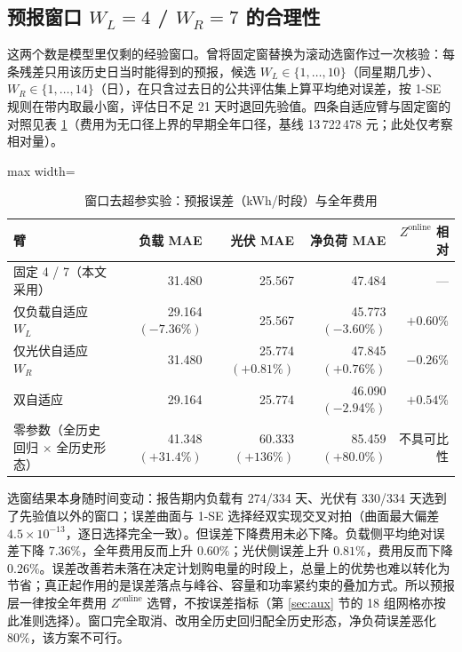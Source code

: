 \documentclass[12pt,a4paper]{ctexart}
\newcommand{\Zon}{Z^{\mathrm{online}}}
\begin{document}
\subsection{预报窗口 $W_L=4$ / $W_R=7$ 的合理性}\label{sec:appBwin}

这两个数是模型里仅剩的经验窗口。曾将固定窗替换为滚动选窗作过一次核验：每条残差只用该历史日当时能得到的预报，候选 $W_L\in\{1,\dots,10\}$（同星期几步）、$W_R\in\{1,\dots,14\}$（日），在只含过去日的公共评估集上算平均绝对误差，按 1-SE 规则在带内取最小窗，评估日不足 21 天时退回先验值。四条自适应臂与固定窗的对照见表 \ref{tab:win}（费用为无口径上界的早期全年口径，基线 13\,722\,478 元；此处仅考察相对量）。

\begin{table}[H]
\centering\footnotesize
\caption{窗口去超参实验：预报误差（kWh/时段）与全年费用}
\begin{adjustbox}{max width=\textwidth}
\begin{tabular}{lrrrr}
\toprule
臂 & 负载 MAE & 光伏 MAE & 净负荷 MAE & $\Zon$ 相对 \\
\midrule
固定 4 / 7（本文采用） & 31.480 & 25.567 & 47.484 & — \\
仅负载自适应 $W_L$ & 29.164 $(-7.36\%)$ & 25.567 & 45.773 $(-3.60\%)$ & $+0.60\%$ \\
仅光伏自适应 $W_R$ & 31.480 & 25.774 $(+0.81\%)$ & 47.845 $(+0.76\%)$ & $-0.26\%$ \\
双自适应 & 29.164 & 25.774 & 46.090 $(-2.94\%)$ & $+0.54\%$ \\
零参数（全历史回归 $\times$ 全历史形态） & 41.348 $(+31.4\%)$ & 60.333 $(+136\%)$ & 85.459 $(+80.0\%)$ & 不具可比性 \\
\bottomrule
\end{tabular}
\end{adjustbox}
\label{tab:win}
\end{table}

选窗结果本身随时间变动：报告期内负载有 274/334 天、光伏有 330/334 天选到了先验值以外的窗口；误差曲面与 1-SE 选择经双实现交叉对拍（曲面最大偏差 $4.5\times10^{-13}$，逐日选择完全一致）。但误差下降费用未必下降。负载侧平均绝对误差下降 $7.36\%$，全年费用反而上升 $0.60\%$；光伏侧误差上升 $0.81\%$，费用反而下降 $0.26\%$。误差改善若未落在决定计划购电量的时段上，总量上的优势也难以转化为节省；真正起作用的是误差落点与峰谷、容量和功率紧约束的叠加方式。所以预报层一律按全年费用 $\Zon$ 选臂，不按误差指标（第 \ref{sec:aux} 节的 18 组网格亦按此准则选择）。窗口完全取消、改用全历史回归配全历史形态，净负荷误差恶化 $80\%$，该方案不可行。
\end{document}
